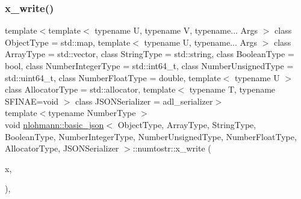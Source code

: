 \subsubsection{\texorpdfstring{x\+\_\+write()}{x\_write()}\hspace{0.1cm}{\footnotesize\ttfamily [1/2]}}
{\footnotesize\ttfamily template$<$template$<$ typename U, typename V, typename... Args $>$ class Object\+Type = std\+::map, template$<$ typename U, typename... Args $>$ class Array\+Type = std\+::vector, class String\+Type  = std\+::string, class Boolean\+Type  = bool, class Number\+Integer\+Type  = std\+::int64\+\_\+t, class Number\+Unsigned\+Type  = std\+::uint64\+\_\+t, class Number\+Float\+Type  = double, template$<$ typename U $>$ class Allocator\+Type = std\+::allocator, template$<$ typename T, typename S\+F\+I\+N\+A\+E=void $>$ class J\+S\+O\+N\+Serializer = adl\+\_\+serializer$>$ \\
template$<$typename Number\+Type $>$ \\
void \hyperlink{classnlohmann_1_1basic__json}{nlohmann\+::basic\+\_\+json}$<$ Object\+Type, Array\+Type, String\+Type, Boolean\+Type, Number\+Integer\+Type, Number\+Unsigned\+Type, Number\+Float\+Type, Allocator\+Type, J\+S\+O\+N\+Serializer $>$\+::numtostr\+::x\+\_\+write (\begin{DoxyParamCaption}\item[{Number\+Type}]{x,  }\item[{std\+::true\+\_\+type}]{ }\end{DoxyParamCaption})\hspace{0.3cm}{\ttfamily [inline]}, {\ttfamily [private]}}

\mbox{\label{structnlohmann_1_1basic__json_1_1numtostr_a91a7a5b4311422f1ad298245501a05d1}} 

